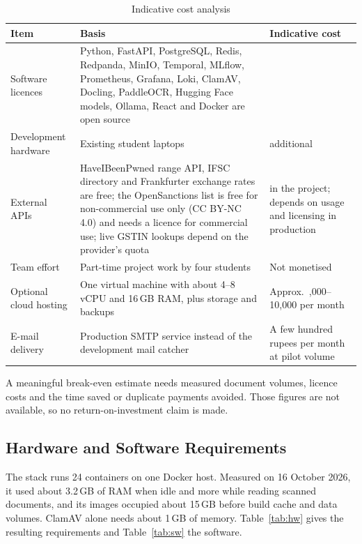 \begin{table}[H]
\centering\tablestyle
\caption{Indicative cost analysis}\label{tab:cost}
\begin{tabularx}{\textwidth}{|L{0.18\textwidth}|Y|L{0.20\textwidth}|}
\hline
\textbf{Item} & \textbf{Basis} & \textbf{Indicative cost} \\ \hline
Software licences & Python, FastAPI, PostgreSQL, Redis, Redpanda, MinIO, Temporal, MLflow, Prometheus, Grafana, Loki, ClamAV, Docling, PaddleOCR, Hugging Face models, Ollama, React and Docker are open source &  \\ \hline
Development hardware & Existing student laptops &  additional \\ \hline
External APIs & HaveIBeenPwned range API, IFSC directory and Frankfurter exchange rates are free; the OpenSanctions list is free for non-commercial use only (CC BY-NC 4.0) and needs a licence for commercial use; live GSTIN lookups depend on the provider's quota &  in the project; depends on usage and licensing in production \\ \hline
Team effort & Part-time project work by four students & Not monetised \\ \hline
Optional cloud hosting & One virtual machine with about 4--8 vCPU and 16\,GB RAM, plus storage and backups & Approx.\ ,000--10,000 per month \\ \hline
E-mail delivery & Production SMTP service instead of the development mail catcher & A few hundred rupees per month at pilot volume \\ \hline
\end{tabularx}
\end{table}

A meaningful break-even estimate needs measured document volumes, licence costs and the time saved or duplicate payments avoided. Those figures are not available, so no return-on-investment claim is made.

\subsection{Hardware and Software Requirements}
The stack runs 24 containers on one Docker host. Measured on 16 October 2026, it used about 3.2\,GB of RAM when idle and more while reading scanned documents, and its images occupied about 15\,GB before build cache and data volumes. ClamAV alone needs about 1\,GB of memory. Table~\ref{tab:hw} gives the resulting requirements and Table~\ref{tab:sw} the software.


